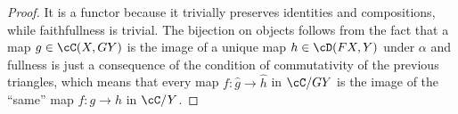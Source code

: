 \documentclass[a4paper,11pt,openany]{scrartcl}
\begin{document}
\begin{proof}
    It is a functor because it trivially preserves identities and
    compositions, while faithfullness is trivial. The bijection on objects
    follows from the fact that
    a map $g\in\cC(X,GY)$ is the image of a unique map $h\in\cD(FX,Y)$ under
    $\alpha$ and fullness is just a consequence of the condition of
    commutativity of the previous triangles, which means that every map
    $f\colon\hat{g}\rightarrow\hat{h}$ in $\cC/GY$ is the image of the ``same''
    map $f\colon g\rightarrow h$ in $\cC/Y$.
\end{proof}
\end{document}
